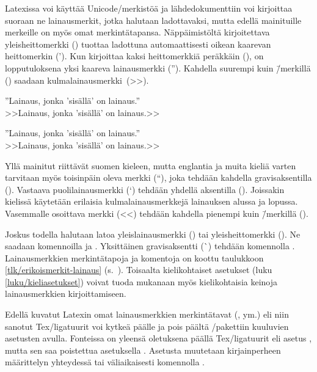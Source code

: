 Latexissa voi käyttää Unicode\-/merkistöä ja lähdedokumenttiin voi
kirjoittaa suoraan ne lainausmerkit, jotka halutaan ladottavaksi, mutta
edellä mainituille merkeille on myös omat merkintätapansa.
Näppäimistöltä kirjoitettava yleisheittomerkki () tuottaa
ladottuna automaattisesti oikean kaarevan heittomerkin ('). Kun
kirjoittaa kaksi heittomerkkiä peräkkäin (), on
lopputuloksena yksi kaareva lainausmerkki (''). Kahdella suurempi kuin
\=/merkillä (\koodim{>>}) saadaan kulmalainausmerkki~(>>).

\begin{koodilohkosis}
''Lainaus, jonka 'sisällä' on lainaus.'' \\
>>Lainaus, jonka 'sisällä' on lainaus.>>
\end{koodilohkosis}

\begin{tulossis}
  ''Lainaus, jonka 'sisällä' on lainaus.'' \\
  >>Lainaus, jonka 'sisällä' on lainaus.>>
\end{tulossis}

\noindent
Yllä mainitut riittävät suomen kieleen, mutta englantia ja muita kieliä
varten tarvitaan myös toisinpäin oleva merkki (``), joka tehdään
kahdella gravisaksentilla (). Vastaava puolilainausmerkki (`)
tehdään yhdellä aksentilla (). Joissakin kielissä käytetään
erilaisia kulmalainausmerkkejä lainauksen alussa ja lopussa. Vasemmalle
osoittava merkki (<<) tehdään kahdella pienempi kuin \=/merkillä
(\koodim{<<}).

Joskus todella halutaan latoa yleislainausmerkki (\textquotedbl) tai
yleisheittomerkki (\textquotesingle). Ne saadaan komennoilla
 ja . Yksittäinen
gravisaksentti (\`{}) tehdään komennolla \komentoarg{}.
Lainausmerkkien merkintätapoja ja komentoja on koottu taulukkoon
\ref{tlk/erikoismerkit-lainaus}
(s.~\pageref{tlk/erikoismerkit-lainaus}). Toisaalta kielikohtaiset
asetukset (luku \ref{luku/kieliasetukset}) voivat tuoda mukanaan myös
kielikohtaisia keinoja lainausmerkkien kirjoittamiseen.

Edellä kuvatut Latexin omat lainausmerkkien merkintätavat (,
\koodi{>>} ym.) eli niin sanotut Tex\-/ligatuurit voi kytkeä päälle ja
pois päältä \-/pakettiin kuuluvien asetusten avulla.
Fonteissa on yleensä oletuksena päällä Tex\-/ligatuurit eli asetus
, mutta sen saa poistettua asetuksella
. Asetusta muutetaan kirjainperheen
määrittelyn yhteydessä tai väliaikaisesti komennolla
.

